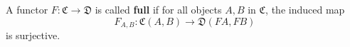 A functor $F: \mathfrak{C} \to \mathfrak{D}$ is called \textbf{full} if for all objects $A, B$ in $\mathfrak{C}$, the induced map
$$F_{A,B}: \mathfrak{C}(A, B) \to \mathfrak{D}(FA, FB)$$
is surjective.
